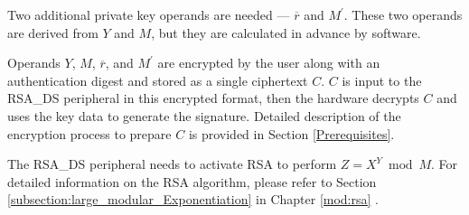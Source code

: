 \documentclass[main\_\_EN.tex]{subfiles}
\begin{document}
Two additional private key operands are needed — \begin{math}\overline{r}\end{math} and
\begin{math}M^{\prime}\end{math}. These two operands are derived from \begin{math}Y\end{math} and \begin{math}M\end{math}, but they are calculated in advance by software.

Operands \begin{math}Y\end{math}, \begin{math}M\end{math}, \begin{math}\overline{r}\end{math}, and \begin{math}M^{\prime}\end{math} are encrypted by the user along with an authentication digest and stored as a single ciphertext \begin{math}C\end{math}. \begin{math}C\end{math} is input to the RSA\_DS peripheral in this encrypted format, then the hardware decrypts \begin{math}C\end{math} and uses the key data to generate the signature. Detailed description of the encryption process to prepare \begin{math}C\end{math} is provided in Section \ref{Prerequisites}.


The RSA\_DS peripheral needs to activate RSA to perform \begin{math}Z = X^{Y} \bmod M\end{math}. For detailed information on the RSA algorithm, please refer to Section \ref{subsection:large_modular_Exponentiation} \textit{} in Chapter \ref{mod:rsa} \textit{}.
\end{document}
